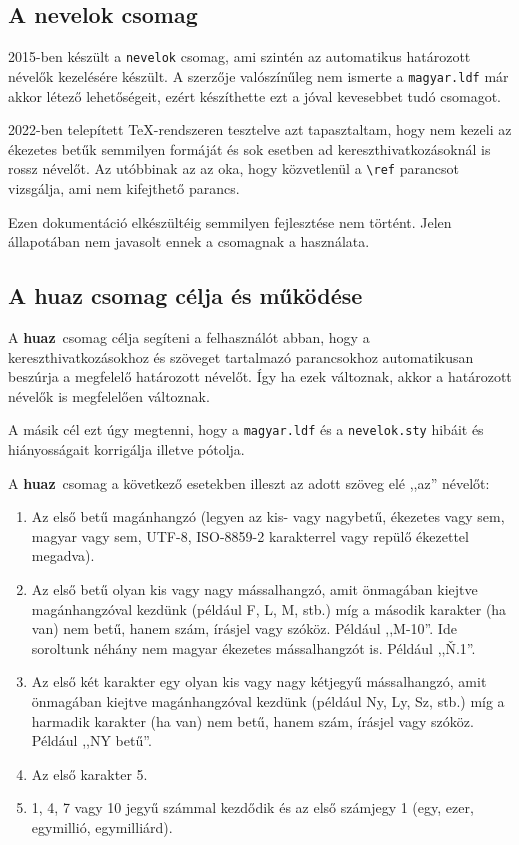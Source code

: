 \documentclass[12pt]{article}
\def\huaz{\textbf{\sffamily hu\color{gray}az}}
\begin{document}
\subsection{A nevelok csomag}

2015-ben készült a \texttt{nevelok} csomag, ami szintén az automatikus határozott névelők kezelésére készült. A szerzője valószínűleg nem ismerte a \texttt{magyar.ldf} már akkor létező lehetőségeit, ezért készíthette ezt a jóval kevesebbet tudó csomagot. 

2022-ben telepített \TeX-rendszeren tesztelve azt tapasztaltam, hogy nem kezeli az ékezetes betűk semmilyen formáját és sok esetben ad kereszthivatkozásoknál is rossz névelőt. Az utóbbinak az az oka, hogy közvetlenül a \verb|\ref| parancsot vizsgálja, ami nem kifejthető parancs. 

Ezen dokumentáció elkészültéig semmilyen fejlesztése nem történt. Jelen állapotában nem javasolt ennek a csomagnak a használata.

\subsection{A \texorpdfstring{\huaz}{huaz} csomag célja és működése}

A \huaz\ csomag célja segíteni a felhasználót abban, hogy a kereszthivatkozásokhoz és szöveget tartalmazó parancsokhoz automatikusan beszúrja a megfelelő határozott névelőt. Így ha ezek változnak, akkor a határozott névelők is megfelelően változnak. 

A másik cél ezt úgy megtenni, hogy a \texttt{magyar.ldf} és a \texttt{nevelok.sty} hibáit és hiányosságait korrigálja illetve pótolja.

A \huaz\ csomag a következő esetekben illeszt az adott szöveg elé ,,az'' névelőt:

\begin{enumerate}
\item Az első betű magánhangzó (legyen az kis- vagy nagybetű, ékezetes vagy sem, magyar vagy sem, UTF-8, ISO-8859-2 karakterrel vagy repülő ékezettel megadva).

\item Az első betű olyan kis vagy nagy mássalhangzó, amit önmagában kiejtve magánhangzóval kezdünk (például F, L, M, stb.) míg a második karakter (ha van) nem betű, hanem szám, írásjel vagy szóköz. Például ,,M-10''. Ide soroltunk néhány nem magyar ékezetes mássalhangzót is. Például ,,Ň.1''.

\item Az első két karakter egy olyan kis vagy nagy kétjegyű mássalhangzó, amit önmagában kiejtve magánhangzóval kezdünk (például Ny, Ly, Sz, stb.) míg a harmadik karakter (ha van) nem betű, hanem szám, írásjel vagy szóköz. Például ,,NY betű''.

\item Az első karakter 5.

\item 1, 4, 7 vagy 10 jegyű számmal kezdődik és az első számjegy 1 (egy, ezer, egymillió, egymilliárd).
\end{enumerate}
\end{document}
